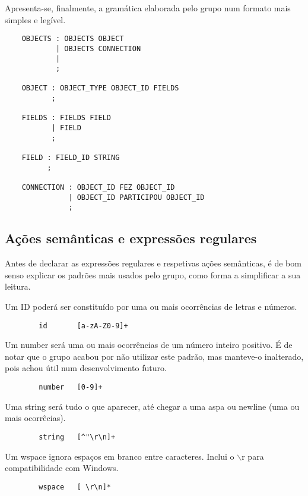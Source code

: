 \documentclass[a4paper]{article}
\begin{document}
\bigskip
\bigskip
\par Apresenta-se, finalmente, a gramática elaborada pelo grupo num formato mais simples e legível.
\bigskip

\begin{lstlisting}
    OBJECTS : OBJECTS OBJECT
            | OBJECTS CONNECTION
            |
            ;
    
    OBJECT : OBJECT_TYPE OBJECT_ID FIELDS
           ;
    
    FIELDS : FIELDS FIELD
           | FIELD
           ;
    
    FIELD : FIELD_ID STRING
          ;
    
    CONNECTION : OBJECT_ID FEZ OBJECT_ID
               | OBJECT_ID PARTICIPOU OBJECT_ID
               ;
\end{lstlisting}

\pagebreak
\subsection{Ações semânticas e expressões regulares}
\label{sec:3.3}
\hspace{3.5mm} Antes de declarar as expressões regulares e respetivas ações semânticas, é de bom senso explicar os padrões mais usados pelo grupo, como forma a simplificar a sua leitura.

\par Um ID poderá ser constituído por uma ou mais ocorrências de letras e números.
\begin{lstlisting}
        id       [a-zA-Z0-9]+
\end{lstlisting}

\par Um number será uma ou mais ocorrências de um número inteiro positivo. É de notar que o grupo acabou por não utilizar este padrão, mas manteve-o inalterado, pois achou útil num desenvolvimento futuro.
\begin{lstlisting}
        number   [0-9]+
\end{lstlisting}

\par Uma string será tudo o que aparecer, até chegar a uma aspa ou newline (uma ou mais ocorrêcias).
\begin{lstlisting}
        string   [^"\r\n]+
\end{lstlisting}

\par Um wspace ignora espaços em branco entre caracteres. Inclui o $\backslash$r para compatibilidade com Windows.
\begin{lstlisting}
        wspace   [ \r\n]*
\end{lstlisting}
\end{document}
